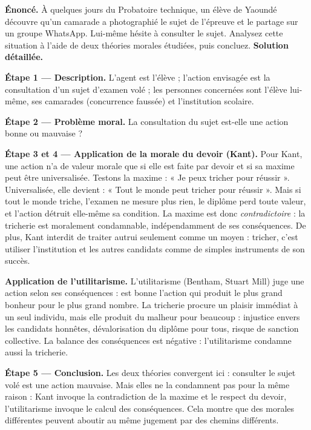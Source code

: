 \documentclass[11pt]{article}
\newcommand{\cle}[1]{{\popxbold\color{popdark}#1}}
\begin{document}
\begin{exoresolu}
\textbf{Énoncé.} À quelques jours du Probatoire technique, un élève de Yaoundé découvre qu'un camarade a photographié le sujet de l'épreuve et le partage sur un groupe WhatsApp. Lui-même hésite à consulter le sujet. Analysez cette situation à l'aide de deux théories morales étudiées, puis concluez.
\tcblower
\textbf{Solution détaillée.}

\textbf{Étape 1 — Description.} L'agent est l'élève ; l'action envisagée est la consultation d'un sujet d'examen volé ; les personnes concernées sont l'élève lui-même, ses camarades (concurrence faussée) et l'institution scolaire.

\textbf{Étape 2 — Problème moral.} La consultation du sujet est-elle une action bonne ou mauvaise ?

\textbf{Étape 3 et 4 — Application de la morale du devoir (Kant).} Pour Kant, une action n'a de valeur morale que si elle est faite par \cle{devoir} et si sa maxime peut être universalisée. Testons la maxime : « Je peux tricher pour réussir ». Universalisée, elle devient : « Tout le monde peut tricher pour réussir ». Mais si tout le monde triche, l'examen ne mesure plus rien, le diplôme perd toute valeur, et l'action détruit elle-même sa condition. La maxime est donc \emph{contradictoire} : la tricherie est moralement condamnable, indépendamment de ses conséquences. De plus, Kant interdit de traiter autrui seulement comme un moyen : tricher, c'est utiliser l'institution et les autres candidats comme de simples instruments de son succès.

\textbf{Application de l'utilitarisme.} L'utilitarisme (Bentham, Stuart Mill) juge une action selon ses \cle{conséquences} : est bonne l'action qui produit le plus grand bonheur pour le plus grand nombre. La tricherie procure un plaisir immédiat à un seul individu, mais elle produit du malheur pour beaucoup : injustice envers les candidats honnêtes, dévalorisation du diplôme pour tous, risque de sanction collective. La balance des conséquences est négative : l'utilitarisme condamne aussi la tricherie.

\textbf{Étape 5 — Conclusion.} Les deux théories convergent ici : consulter le sujet volé est une action mauvaise. Mais elles ne la condamnent pas pour la même raison : Kant invoque la contradiction de la maxime et le respect du devoir, l'utilitarisme invoque le calcul des conséquences. Cela montre que des morales différentes peuvent aboutir au même jugement par des chemins différents.
\end{exoresolu}
\end{document}
